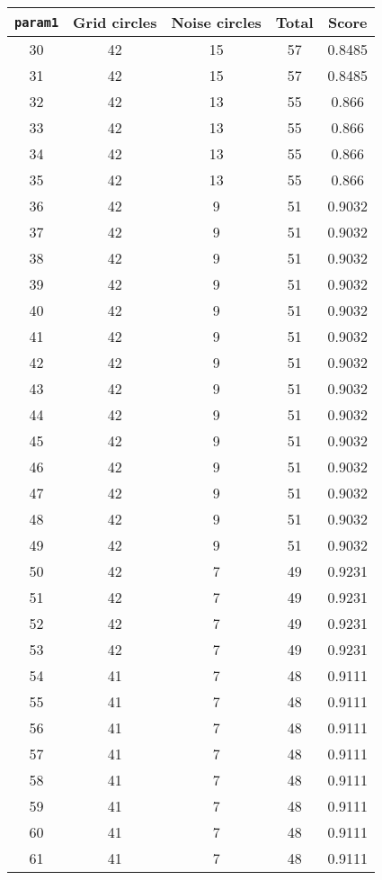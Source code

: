 \documentclass[letterpaper, 12pt]{article}
\begin{document}
\begin{longtable}{|c|c|c|c|c|}
\hline
\textbf{\texttt{param1}} & \textbf{Grid circles} & \textbf{Noise circles} & \textbf{Total} & \textbf{Score} \\
\hline
30 & 42 & 15 & 57 & 0.8485 \\
\hline
31 & 42 & 15 & 57 & 0.8485 \\
\hline
32 & 42 & 13 & 55 & 0.866 \\
\hline
33 & 42 & 13 & 55 & 0.866 \\
\hline
34 & 42 & 13 & 55 & 0.866 \\
\hline
35 & 42 & 13 & 55 & 0.866 \\
\hline
36 & 42 & 9 & 51 & 0.9032 \\
\hline
37 & 42 & 9 & 51 & 0.9032 \\
\hline
38 & 42 & 9 & 51 & 0.9032 \\
\hline
39 & 42 & 9 & 51 & 0.9032 \\
\hline
40 & 42 & 9 & 51 & 0.9032 \\
\hline
41 & 42 & 9 & 51 & 0.9032 \\
\hline
42 & 42 & 9 & 51 & 0.9032 \\
\hline
43 & 42 & 9 & 51 & 0.9032 \\
\hline
44 & 42 & 9 & 51 & 0.9032 \\
\hline
45 & 42 & 9 & 51 & 0.9032 \\
\hline
46 & 42 & 9 & 51 & 0.9032 \\
\hline
47 & 42 & 9 & 51 & 0.9032 \\
\hline
48 & 42 & 9 & 51 & 0.9032 \\
\hline
49 & 42 & 9 & 51 & 0.9032 \\
\hline
50 & 42 & 7 & 49 & 0.9231 \\
\hline
51 & 42 & 7 & 49 & 0.9231 \\
\hline
52 & 42 & 7 & 49 & 0.9231 \\
\hline
53 & 42 & 7 & 49 & 0.9231 \\
\hline
54 & 41 & 7 & 48 & 0.9111 \\
\hline
55 & 41 & 7 & 48 & 0.9111 \\
\hline
56 & 41 & 7 & 48 & 0.9111 \\
\hline
57 & 41 & 7 & 48 & 0.9111 \\
\hline
58 & 41 & 7 & 48 & 0.9111 \\
\hline
59 & 41 & 7 & 48 & 0.9111 \\
\hline
60 & 41 & 7 & 48 & 0.9111 \\
\hline
61 & 41 & 7 & 48 & 0.9111 \\

\end{longtable}
\end{document}
